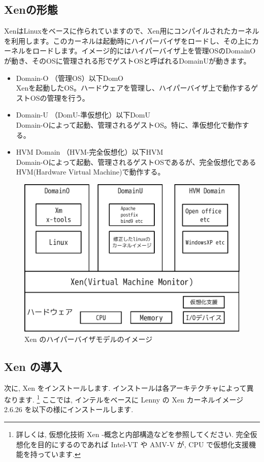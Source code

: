 \documentclass[mingoth,a4paper]{jsarticle}
\begin{document}
\subsection{Xenの形態}
XenはLinuxをベースに作られていますので、Xen用にコンパイルされたカーネルを利用します。このカーネルは起動時にハイパーバイザをロードし、その上にカーネルをロードします。イメージ的にはハイパーバイザ上を管理OSのDomainOが動き、そのOSに管理される形でゲストOSと呼ばれるDomainUが動きます。

\begin{itemize}
\item Domain-O （管理OS）以下DomO \\
      Xenを起動したOS。ハードウェアを管理し、ハイパーバイザ上で動作するゲストOSの管理を行う。
\item Domain-U （DomU-準仮想化）以下DomU \\
      Domain-Oによって起動、管理されるゲストOS。特に、準仮想化で動作する。
\item HVM Domain （HVM-完全仮想化）以下HVM \\
      Domain-Oによって起動、管理されるゲストOSであるが、完全仮想化であるHVM(Hardware Virtual Machine)で動作する。
\end{itemize}

\begin{figure}[h!]
 \centering
 \includegraphics[scale=0.6]{image201001/xen-image.png}
 \caption{Xen のハイパーバイザモデルのイメージ}
\end{figure}
\clearpage

\subsection{Xen の導入}
次に, Xen をインストールします. インストールは各アーキテクチャによって異なります. \footnote{詳しくは, 仮想化技術 Xen -概念と内部構造などを参照してください. 完全仮想化を目的にするのであれば Intel-VT や AMV-V が, CPU で仮想化支援機能を持っています. } ここでは, インテルをベースに Lenny の Xen カーネルイメージ 2.6.26 を以下の様にインストールします.
\end{document}
